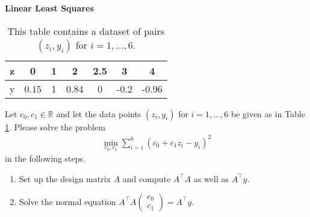 \textbf{Linear Least Squares}\\
\begin{table}[h!]
	\centering
	\begin{tabular}{l|c c c c c c}
		z&0&1&2&2.5&3&4\\
		\hline
		y&0.15&1&0.84&0&-0.2&-0.96
	\end{tabular}
	\caption{This table contains a dataset of pairs $(z_i, y_i)$ for $i = 1,\dots,6$.}
	\label{tab:data}
\end{table}
Let $c_0,c_1 \in \mathbb{R}$ and let the data points $(z_i, y_i)$ for $i=1,\dots,6$ be given as in Table \ref{tab:data}. Please solve the problem
	\begin{align*}
		\min \limits_{c_0,c_1} \sum_{i=1}^6 (c_0 + c_1z_i - y_i)^2
	\end{align*}
	in the following steps.
	\begin{enumerate}
		\item Set up the design matrix $A$ and compute $A^\top A$ as well as $A^\top y$.
		\item Solve the normal equation $A^\top A \begin{pmatrix}
		c_0\\
		c_1
		\end{pmatrix} = A^\top y$.
	\end{enumerate}
